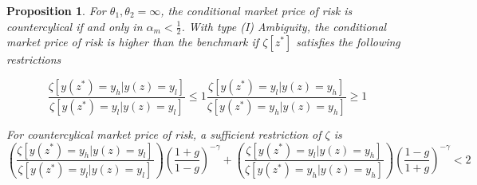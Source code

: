 \documentclass[12pt]{article}
\newtheorem{proposition}{Proposition}
\begin{document}

\begin{proposition}
\label{propo-7}
For $\theta_1,\theta_2=\infty$, the conditional market price of risk is countercylical if and only in $\alpha_m < \frac{1}{2}$. With type (I) Ambiguity, the conditional market price of risk is higher than the benchmark if $\zeta[z^*]$ satisfies the following restrictions

\begin{subequations}
\label{eq:mprgreaterthanbenchmarkcondition}
\begin{equation}
	\frac{\zeta[y(z^*)=y_h|y(z)=y_l]}{\zeta[y(z^*)=y_l|y(z)=y_l]} \leq 1
\end{equation}
\begin{equation}
	\frac{\zeta[y(z^*)=y_l|y(z)=y_h]}{\zeta[y(z^*)=y_h|y(z)=y_h]} \geq 1
\end{equation}
\end{subequations}

For countercylical market price of risk, a sufficient restriction of $\zeta$ is
\begin{equation}
\label{eq:countercylicalmprcondition}
\left(\frac{\zeta[y(z^*)=y_h|y(z)=y_l]}{\zeta[y(z^*)=y_l|y(z)=y_l]}\right)\left(\frac{1+g}{1-g}\right)^{-\gamma}+ \left(\frac{\zeta[y(z^*)=y_l|y(z)=y_h]}{\zeta[y(z^*)=y_h|y(z)=y_h]}\right)\left(\frac{1-g}{1+g}\right)^{-\gamma} <2
\end{equation}
\end{proposition}
\end{document}

